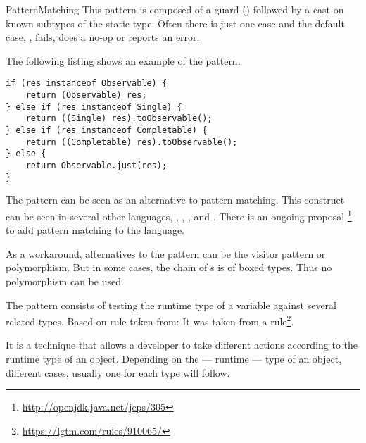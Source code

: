 
\begin{pattern}{PatternMatching}
This pattern is composed of a guard () followed by a
cast on known subtypes of the static type.
Often there is just one case and the default case, \ie,
 fails, does a no-op or reports an error.

\instances{}
The following listing shows an example of the \pname{} pattern.
\begin{lstlisting}[style=java,caption={Instance of \pname{} (from \url{http://bit.ly/2ns4EJq}) }]
if (res instanceof Observable) {
	return (Observable) res;
} else if (res instanceof Single) {
	return ((Single) res).toObservable();
} else if (res instanceof Completable) {
	return ((Completable) res).toObservable();
} else {
	return Observable.just(res);
}
\end{lstlisting}

\discussion{}
The \pname{} pattern can be seen as an \adhoc{}
alternative to pattern matching.
This construct can be seen in several other languages, \eg,
\haskell{}, \scala{}, and \cs{}.
There is an ongoing proposal%
\footnote{\url{http://openjdk.java.net/jeps/305}} to add pattern
matching to the \java{} language.

As a workaround, alternatives to the \pname{} pattern can be the visitor pattern or polymorphism.
But in some cases, the chain of s is of boxed types.
Thus no polymorphism can be used.


The \pname{} pattern consists of testing the runtime type of a variable against several related types.
Based on rule taken from:
It was taken from a \lgtm{} rule\footnote{\url{https://lgtm.com/rules/910065/}}.

It is a technique that allows a developer to take different actions according to the runtime type of an object.
Depending on the --- runtime --- type of an object, different cases, usually one for each type will follow.

\end{pattern}
